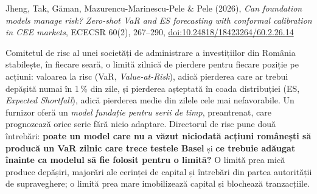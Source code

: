
\renewcommand{\emqacase}{\T{Research case 6 (Lecture 13)}{Studiul de caz 6 (cursul 13)}}

%
          { Jheng, Tak, Găman, Mazurencu-Marinescu-Pele \& Pele (2026), \emph{Can foundation models manage risk? Zero-shot VaR and ES forecasting with conformal calibration in CEE markets},
           ECECSR 60(2), 267--290, \href{https://doi.org/10.24818/18423264/60.2.26.14}{doi:10.24818/18423264/60.2.26.14}}

\begin{scenario}
%
{Comitetul de risc al unei societăți de administrare a investițiilor din România stabilește, în fiecare seară, o limită zilnică de pierdere pentru fiecare poziție pe acțiuni: valoarea la risc (VaR, \emph{Value-at-Risk}), adică pierderea care ar trebui depășită numai în 1\,\% din zile, și pierderea așteptată în coada distribuției (ES, \emph{Expected Shortfall}), adică pierderea medie din zilele cele mai nefavorabile.
Un furnizor oferă un \emph{model fundație pentru serii de timp}, preantrenat, care prognozează orice serie fără nicio adaptare. Directorul de risc pune două întrebări:
\textbf{poate un model care nu a văzut niciodată acțiuni românești să producă un VaR zilnic care trece testele Basel} și \textbf{ce trebuie adăugat înainte ca modelul să fie folosit pentru o limită?}
O limită prea mică produce depășiri, majorări ale cerinței de capital și întrebări din partea autorității de supraveghere; o limită prea mare imobilizează capital și blochează tranzacțiile.}
\end{scenario}

